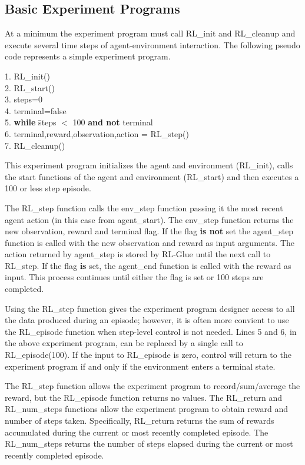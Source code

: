 \documentclass[11pt]{article}
\begin{document}
\subsection{Basic Experiment Programs}
At a minimum the experiment program must call RL\_init and RL\_cleanup and execute several time steps of agent-environment interaction. The following pseudo code represents a simple experiment program.
\begin{tabbing}
1. RL\_init()\\
2. RL\_start()\\
3. steps=0\\  
4. terminal=false \\
5. {\bf while} \=steps $<$ 100 {\bf and not} terminal\\
6.\> terminal,reward,observation,action = RL\_step()\\
7. RL\_cleanup()
\end{tabbing}
This experiment program initializes the agent and environment (RL\_init), calls the start functions of the agent and environment (RL\_start) and then executes a 100 or less step episode. 

The RL\_step function calls the env\_step function passing it the most recent agent action (in this case from agent\_start). The env\_step function returns the new observation, reward and terminal flag. If the flag {\bf is not} set the agent\_step function is called with the new observation and reward as input arguments. The action returned by agent\_step is stored by RL-Glue until the next call to RL\_step. If the flag {\bf is} set, the agent\_end function is called with the reward as input. This process continues until either the flag is set or 100 steps are completed. 

Using the RL\_step function gives the experiment program designer access to all the data produced during an episode; however, it is often more convient to use the RL\_episode function when step-level control is not needed. Lines 5 and 6, in the above experiment program, can be replaced by a single call to RL\_episode(100). If the input to RL\_episode is zero, control will return to the experiment program if and only if the environment enters a terminal state.

The RL\_step function allows the experiment program to record/sum/average the reward, but the RL\_episode function returns no values. The RL\_return and RL\_num\_steps functions allow the experiment program to obtain reward and number of steps taken. Specifically, RL\_return returns the sum of rewards accumulated during the current or most recently completed episode. The RL\_num\_steps returns the number of steps elapsed during the current or most recently completed episode. 
\end{document}
